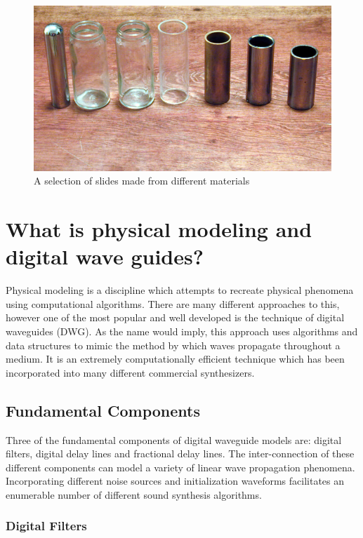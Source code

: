 \documentclass[main.tex]{subfiles}
\begin{document}
\begin{figure}[h]
    \centering
    \includegraphics[scale=.35]{./images/pictures/Slide-guitar-different-slides-768x427.jpg}
    \caption{A selection of slides made from different materials}
    \label{fig:slide_types}
\end{figure}

\section{What is physical modeling and digital wave guides?}

Physical modeling is a discipline which attempts to recreate physical phenomena using computational algorithms. There are many different approaches to this, however one of the most popular and well developed is the technique of digital waveguides (DWG). As the name would imply, this approach uses algorithms and data structures to mimic the method by which waves propagate throughout a medium. It is an extremely computationally efficient technique which has been incorporated into many different commercial synthesizers.

\subsection{Fundamental Components}

Three of the fundamental components of digital waveguide models are: digital filters, digital delay lines and fractional delay lines. The inter-connection of these different components can model a variety of linear wave propagation phenomena. Incorporating different noise sources and initialization waveforms facilitates an enumerable number of different sound synthesis algorithms.

\subsubsection{Digital Filters}
\end{document}
